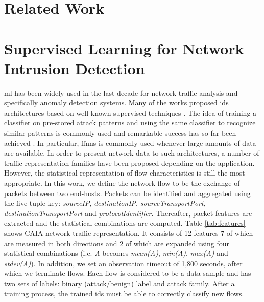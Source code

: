 \documentclass[conference]{IEEEtran}
\begin{document}
\section{Related Work}

\section{Supervised Learning for Network Intrusion Detection}

\gls{ml} has been widely used in the last decade for network traffic analysis and specifically anomaly detection systems. Many of the works proposed \gls{ids} architectures based on well-known supervised techniques \cite{survey}. The idea of training a classifier on pre-stored attack patterns and using the same classifier to recognize similar patterns is commonly used and remarkable success has so far been achieved \cite{survey}. In particular, \glspl{ffnn} is commonly used whenever large amounts of data are available. In order to present network data to such architectures, a number of traffic representation families have been proposed depending on the application. However, the statistical representation of flow characteristics is still the most appropriate. In this work, we define the network flow to be the exchange of packets between two end-hosts. Packets can be identified and aggregated using the five-tuple key: \emph{sourceIP}, \emph{destinationIP}, \emph{sourceTransportPort}, \emph{destinationTransportPort} and \emph{protocolIdentifier}. Thereafter, packet features are extracted and the statistical combinations are computed. Table \ref{tab:features} shows CAIA \cite{williams_preliminary_2006} network traffic representation. It consists of 12 features 7 of which are measured in both directions and 2 of which are expanded using four statistical combinations (i.e. \emph{A} becomes \emph{mean(A)}, \emph{min(A)}, \emph{max(A)} and \emph{stdev(A)}). In addition, we set an observation timeout of 1,800 seconds, after which we terminate flows. Each flow is considered to be a data sample and has two sets of labels: binary (attack/benign) label and attack family. After a training process, the trained \gls{ids} must be able to correctly classify new flows.
\end{document}
